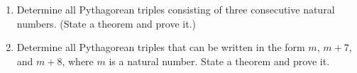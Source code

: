\begin{enumerate}
\vskip6pt
\noindent
\begin{enumerate}
  \item Determine all Pythagorean triples consisting of three consecutive natural numbers.  (State a theorem and prove it.)
  \item Determine all Pythagorean triples that can be written in the form $m$, $m + 7$, and $m + 8$, where $m$ is a natural number.  State a theorem and prove it.
\end{enumerate}
\end{enumerate}

\hbreak
\endinput

